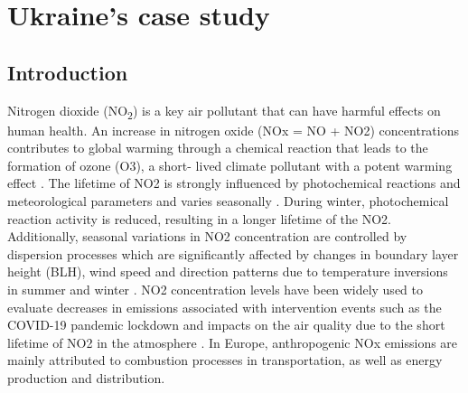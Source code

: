 \chapter{Ukraine's case study}
\renewcommand{\headrulewidth}{0pt}
\lhead[\thepage]{\leftmark}
\rhead[\leftmark]{\thepage}
\cfoot[]{}
\section{Introduction}
Nitrogen dioxide (NO\textsubscript{2}) is a key air pollutant that can have harmful effects on human health. An increase in nitrogen oxide (NOx = NO + NO2) concentrations contributes to global warming through a chemical reaction that leads to the formation of ozone (O3), a short- lived climate pollutant with a potent warming effect \citep{ipcc2013}. The lifetime of NO2 is strongly influenced by photochemical reactions and meteorological parameters \citep{barre2021estimating} and varies seasonally \citep{dragomir2015modeling,kendrick2015diurnal}. During winter, photochemical reaction activity is reduced, resulting in a longer lifetime of the NO2. Additionally, seasonal variations in NO2 concentration are controlled by dispersion processes which are significantly affected by changes in boundary layer height (BLH), wind speed and direction patterns due to temperature inversions in summer and winter \citep{barre2021estimating,kendrick2015diurnal}. NO2 concentration levels have been widely used to evaluate decreases in emissions associated with intervention events such as the COVID-19 pandemic lockdown and impacts on the air quality due to the short lifetime of NO2 in the atmosphere \citep{barre2021estimating,cooper2022global}.
In Europe, anthropogenic NOx emissions are mainly attributed to combustion processes in transportation, as well as energy production and distribution. \par
